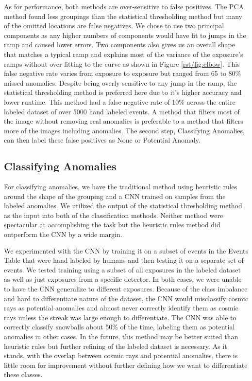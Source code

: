 As for performance, both methods are over-sensitive to false positives.
The PCA method found less groupings than the statistical thresholding method but many of the omitted locations are false negatives.
We chose to use two principal components as any higher numbers of components would have fit to jumps in the ramp and caused lower errors.
Two components also gives us an overall shape that matches a typical ramp and explains most of the variance of the exposure's ramps without over fitting to the curve as shown in Figure \ref{rst/fig:elbow}.
This false negative rate varies from exposure to exposure but ranged from 65 to 80\% missed anomalies. 
Despite being overly sensitive to any jump in the ramp, the statistical thresholding method is preferred here due to it's higher accuracy and lower runtime.
This method had a false negative rate of 10\% across the entire labeled dataset of over 5000 hand labeled events. 
A method that filters most of the image without removing real anomalies is preferable to a method that filters more of the images including anomalies. The second step, Classifying Anomalies, can then label these false positives as None or Potential Anomaly. 
\subsection{Classifying Anomalies}
For classifying anomalies, we have the traditional method using heuristic rules around the shape of the grouping and a CNN trained on samples from the labeled anomalies. 
We utilized the output of the statistical thresholding method as the input into both of the classification methods. 
Neither method were spectacular at accomplishing the task but the heuristic rules method did outperform the CNN by a wide margin. 

We experimented with the CNN by training it on a subset of events in the Events Table that were hand labeled by humans and then testing it on a separate set of events. 
We tested training using a subset of all exposures in the labeled dataset as well as just exposures from a specific detector.
In both cases, we were unable to have the CNN generalize to different exposures. 
Because of the class imbalance and hard to differentiate nature of the dataset, the CNN would misclassify cosmic rays as potential anomalies and almost never correctly identify them as cosmic rays unless the streak was large enough to differentiate. 
The CNN was able to correctly classify snowballs about 50\% of the time, labeling them as potential anomalies in other cases. 
In the future, this method may be better suited than heuristic rules but further refining of the labeled dataset is necessary. 
As it stands, with the overlap between cosmic rays and potential anomalies, there is little room for improvement without further defining how we want to differentiate these classes. 

